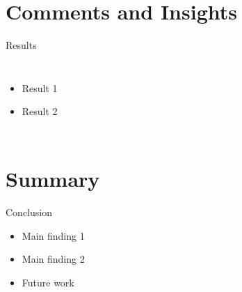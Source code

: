 \documentclass[aspectratio=169]{beamer}  %
\begin{document}
\section{Comments and Insights}
\begin{frame}{Results}
    \begin{columns}
        \begin{itemize}
            \item Result 1
            \item Result 2
        \end{itemize}
        
    \end{columns}
\end{frame}

\section{Summary}
\begin{frame}{Conclusion}
    \begin{itemize}
        \item Main finding 1
        \item Main finding 2
        \item Future work
    \end{itemize}
\end{frame}
\end{document}

